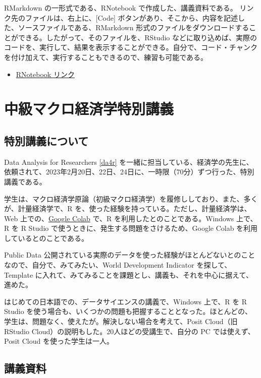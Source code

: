 \documentclass[
]{book}
\providecommand{\tightlist}{%
  \setlength{\itemsep}{0pt}\setlength{\parskip}{0pt}}
\theoremstyle{definition}
\theoremstyle{definition}
\theoremstyle{definition}
\theoremstyle{definition}
\theoremstyle{remark}
\begin{document}
RMarkdown の一形式である、RNotebook で作成した、講義資料である。
リンク先のファイルは、右上に、{[}Code{]} ボタンがあり、そこから、内容を記述した、ソースファイルである、RMarkdown 形式のファイルをダウンロードすることができる。したがって、そのファイルを、RStudio などに取り込めば、実際のコードを、実行して、結果を表示することができる。自分で、コード・チャンクを付け加えて、実行することもできるので、練習も可能である。

\begin{itemize}
\tightlist
\item
  \href{https://ds-sl.github.io/intro2r/intro2r.nb.html}{RNotebook リンク}
\end{itemize}

\hypertarget{eco232}{%
\chapter{中級マクロ経済学特別講義}\label{eco232}}

\hypertarget{ux7279ux5225ux8b1bux7fa9ux306bux3064ux3044ux3066}{%
\section{特別講義について}\label{ux7279ux5225ux8b1bux7fa9ux306bux3064ux3044ux3066}}

Data Analysis for Researchers \ref{da4r} を一緒に担当している、経済学の先生に、依頼されて、2023年2月20日、22日、24日に、一時限（70分）ずつ行った、特別講義である。

学生は、マクロ経済学原論（初級マクロ経済学）を履修ししており、また、多くが、計量経済学で、R を、使った経験を持っている。ただし、計量経済学は、Web 上での、\href{https://research.google.com/colaboratory/faq.html}{Google Colab} で、R を利用したとのことである。Windows 上で、R を R Studio で使うときに、発生する問題をさけるため、Google Colab を利用しているとのことである。

Public Data 公開されている実際のデータを使った経験がほとんどないとのことなので、自分で、みてみたい、World Development Indicator を探して、Template に入れて、みてみることを課題とし、講義も、それを中心に据えて、進めた。

はじめての日本語での、データサイエンスの講義で、Windows 上で、R を R Studio を使う場合も、いくつかの問題も把握することとなった。ほとんどの、学生は、問題なく、使えたが。解決しない場合を考えて、Posit Cloud（旧 RStudio Cloud）の説明もした。20人ほどの受講生で、自分の PC では使えず、Posit Cloud を使った学生は一人。

\hypertarget{ux8b1bux7fa9ux8cc7ux6599-1}{%
\section{講義資料}\label{ux8b1bux7fa9ux8cc7ux6599-1}}
\end{document}
